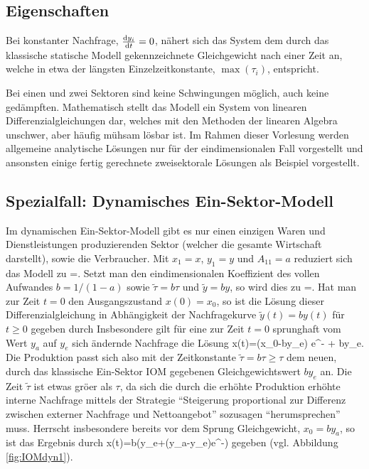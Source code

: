 \subsection*{Eigenschaften}
\bi
\item Bei konstanter Nachfrage, $\frac{{\rm d} y_i}{{\rm d} t}=0$, n\"ahert sich das
System dem durch das
klassische statische Modell  gekennzeichnete Gleichgewicht
nach einer Zeit an, welche in etwa der l\"angsten
Einzelzeitkonstante, $\max(\tau_i)$, entspricht.
\item Bei einen und zwei Sektoren sind keine Schwingungen m\"oglich,
auch keine ge\-d\"ampf\-ten.
\ei
Mathematisch stellt das Modell ein System von linearen
Differenzialgleichungen dar, welches mit den Methoden der
linearen Algebra unschwer, aber h\"aufig m\"uhsam l\"osbar ist.
Im Rahmen dieser Vorlesung werden allgemeine analytische 
L\"osungen nur f\"ur  der eindimensionalen
Fall vorgestellt und ansonsten einige fertig gerechnete zweisektorale
L\"osungen als Beispiel vorgestellt.


\subsection{Spezialfall: Dynamisches Ein-Sektor-Modell}

\newcommand{\tiltau}{\tilde{\tau}}
\newcommand{\tily}{\tilde{y}}

Im dynamischen Ein-Sektor-Modell gibt es nur einen einzigen Waren und
Dienstleistungen produzierenden Sektor (welcher die
gesamte Wirtschaft darstellt), sowie die Verbraucher. Mit $x_1=x$,
$y_1=y$ und $A_{11}=a$ reduziert sich das Modell
  zu
\bdm
{}=\left[y(t)-(1-a)x(t)\right].
\edm
Setzt man den eindimensionalen Koeffizient des vollen Aufwandes
$b=1/(1-a)$ sowie
$\tiltau=b\tau$ und $\tily=by$, so wird dies zu
\be
\label{IOMdynSingle}
=\frac{1}{\tiltau}\left[\tily(t)-x(t)\right].
\ee
Hat man zur Zeit $t=0$ den Ausgangszustand $x(0)=x_0$, so ist die
L\"osung dieser Differenzialgleichung in Abh\"angigkeit der
Nachfragekurve $\tily(t)=by(t)$ f\"ur $t\ge 0$ gegeben durch
\maineq{IOMdynSingleLoes}{
x(t)=x_0e^{-\frac{t}{\tiltau}}+\frac{1}{\tiltau} \int\limits_0^{t}
e^{-\frac{t-t'}{\tiltau}}\tily(t')\diff{t'}.
}
Insbesondere gilt f\"ur eine zur Zeit $t=0$ sprunghaft vom Wert $y_a$
auf $y_e$ sich \"andernde Nachfrage die L\"osung
\be
x(t)=\left(x_0-by_e\right) e^{-} + by_e.
\ee
Die Produktion passt sich also mit der Zeitkonstante $\tiltau=b\tau
\ge \tau$ dem neuen, durch das klassische Ein-Sektor IOM gegebenen
Gleichgewichtswert $by_e$ an. Die Zeit $\tiltau$ ist etwas gr\"o\3er
als $\tau$, da sich die durch die erh\"ohte Produktion erh\"ohte
interne Nachfrage mittels der Strategie ``Steigerung
proportional zur Differenz zwischen externer Nachfrage und Nettoangebot''
sozusagen ``herumsprechen'' muss.
 Herrscht insbesondere bereits vor dem
Sprung Gleichgewicht, $x_0=by_a$, so ist das Ergebnis durch 
\bdm
x(t)=b\left(y_e+(y_a-y_e)e^{-}\right)
\edm
gegeben (vgl. Abbildung \ref{fig:IOMdyn1}).


